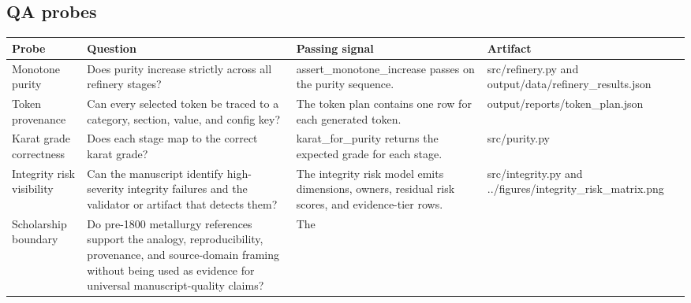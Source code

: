 \documentclass[
]{article}
\newcounter{none} %
\begin{document}
\subsection{QA probes}\label{qa-probes}

{\def\LTcaptype{none} %
\begin{longtable}[]{@{}
  >{\raggedright\arraybackslash}p{}
  >{\raggedright\arraybackslash}p{}
  >{\raggedright\arraybackslash}p{}
  >{\raggedright\arraybackslash}p{}@{}}
\toprule\noalign{}
\begin{minipage}[b]{\linewidth}\raggedright
Probe
\end{minipage} & \begin{minipage}[b]{\linewidth}\raggedright
Question
\end{minipage} & \begin{minipage}[b]{\linewidth}\raggedright
Passing signal
\end{minipage} & \begin{minipage}[b]{\linewidth}\raggedright
Artifact
\end{minipage} \\
\midrule\noalign{}
\endhead
\bottomrule\noalign{}
\endlastfoot
Monotone purity & Does purity increase strictly across all refinery
stages? & assert\_monotone\_increase passes on the purity sequence. &
src/refinery.py and output/data/refinery\_results.json \\
Token provenance & Can every selected token be traced to a category,
section, value, and config key? & The token plan contains one row for
each generated token. & output/reports/token\_plan.json \\
Karat grade correctness & Does each stage map to the correct karat
grade? & karat\_for\_purity returns the expected grade for each stage. &
src/purity.py \\
Integrity risk visibility & Can the manuscript identify high-severity
integrity failures and the validator or artifact that detects them? &
The integrity risk model emits dimensions, owners, residual risk scores,
and evidence-tier rows. & src/integrity.py and
../figures/integrity\_risk\_matrix.png \\
Scholarship boundary & Do pre-1800 metallurgy references support the
analogy, reproducibility, provenance, and source-domain framing without
being used as evidence for universal manuscript-quality claims? & The

\end{longtable}}
\end{document}
